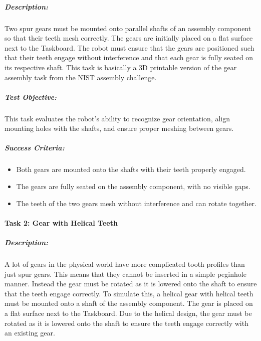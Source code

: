 \documentclass[letterpaper,10pt,english]{sphinxmanual}
\let\sphinxpxdimen\pdfpxdimen\else\newdimen\sphinxpxdimen
\begin{document}
\subparagraph{Description:}
\label{\detokenize{robotic_instructions_gear_tasks:description}}
\sphinxAtStartPar
Two spur gears must be mounted onto parallel shafts of an assembly component so that their teeth mesh correctly.
The gears are initially placed on a flat surface next to the Taskboard.
The robot must ensure that the gears are positioned such that their teeth engage without interference and that each gear is fully seated on its respective shaft.
This task is basically a 3D printable version of the gear assembly task from the NIST assembly challenge.

\noindent{\hspace*{\fill}\sphinxincludegraphics[width=400\sphinxpxdimen]{{gear_assembly_taskboard_two_gears}.png}\hspace*{\fill}}


\subparagraph{Test Objective:}
\label{\detokenize{robotic_instructions_gear_tasks:test-objective}}
\sphinxAtStartPar
This task evaluates the robot’s ability to recognize gear orientation, align mounting holes with the shafts, and ensure proper meshing between gears.


\subparagraph{Success Criteria:}
\label{\detokenize{robotic_instructions_gear_tasks:success-criteria}}\begin{itemize}
\item {} 
\sphinxAtStartPar
Both gears are mounted onto the shafts with their teeth properly engaged.

\item {} 
\sphinxAtStartPar
The gears are fully seated on the assembly component, with no visible gaps.

\item {} 
\sphinxAtStartPar
The teeth of the two gears mesh without interference and can rotate together.

\end{itemize}


\paragraph{Task 2: Gear with Helical Teeth}
\label{\detokenize{robotic_instructions_gear_tasks:task-2-gear-with-helical-teeth}}

\subparagraph{Description:}
\label{\detokenize{robotic_instructions_gear_tasks:id1}}
\sphinxAtStartPar
A lot of gears in the physical world have more complicated tooth profiles than just spur gears.
This means that they cannot be inserted in a simple peg\sphinxhyphen{}in\sphinxhyphen{}hole manner.
Instead the gear must be rotated as it is lowered onto the shaft to ensure that the teeth engage correctly.
To simulate this, a helical gear with helical teeth must be mounted onto a shaft of the assembly component.
The gear is placed on a flat surface next to the Taskboard.
Due to the helical design, the gear must be rotated as it is lowered onto the shaft to ensure the teeth engage correctly with an existing gear.
\end{document}
